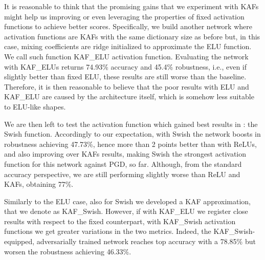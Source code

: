 \documentclass[LaM,binding=0.6cm]{./packages/sapthesis/sapthesis}
\begin{document}
        It is reasonable to think that the promising gains that we experiment with KAFs might help us improving or even leveraging the properties of fixed activation functions
        to achieve better scores. Specifically, we build another network where activation functions are KAFs with the same dictionary size as before but, in this case, mixing coefficients
        are ridge initialized to approximate the ELU function. We call such function KAF\_ELU activation function. Evaluating the network with KAF\_ELUs returns 74.93\% accuracy 
        and 45.4\% robustness, i.e., even if slightly better than fixed ELU, these results are still worse than the baseline. Therefore, it is then reasonable to believe that the poor 
        results with ELU and KAF\_ELU are caused by the architecture itself, which is somehow less suitable to ELU-like shapes.

        We are then left to test the activation function which gained best results in \cite{smooth_adversarial_training}: the Swish function. Accordingly to our expectation, with Swish the network 
        boosts in robustness achieving 47.73\%, hence more than 2 points better than with ReLUs, and also improving over KAFs results, making Swish the strongest activation 
        function for this network against PGD, so far. Although, from the standard accuracy perspective, we are still performing slightly worse than ReLU and KAFs, obtaining 
        77\%.

        Similarly to the ELU case, also for Swish we developed a KAF approximation, that we denote as KAF\_Swish. However, if with KAF\_ELU we register close results with respect 
        to the fixed counterpart, with KAF\_Swish activation functions we get greater variations in the two metrics. Indeed, the KAF\_Swish-equipped, adversarially trained 
        network reaches top accuracy with a 78.85\% but worsen the robustness achieving 46.33\%.
\end{document}

